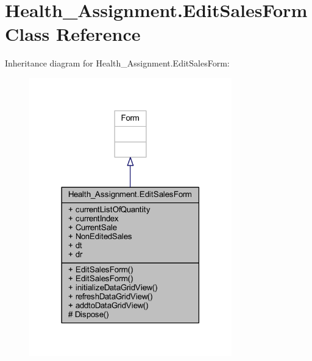 \hypertarget{class_health___assignment_1_1_edit_sales_form}{}\section{Health\+\_\+\+Assignment.\+Edit\+Sales\+Form Class Reference}
\label{class_health___assignment_1_1_edit_sales_form}


Inheritance diagram for Health\+\_\+\+Assignment.\+Edit\+Sales\+Form\+:\nopagebreak
\begin{figure}[H]
\begin{center}
\leavevmode
\includegraphics[width=249pt]{class_health___assignment_1_1_edit_sales_form__inherit__graph}
\end{center}
\end{figure}


